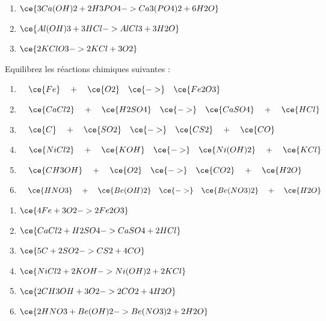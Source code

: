 \documentclass[
  11pt,
  a4paper,
  openany]{book}
\begin{document}
\begin{Answer}

\begin{enumerate}
\def\labelenumi{\arabic{enumi}.}
\item
  \(\ce{3Ca(OH)2 + 2H3PO4 -> Ca3(PO4)2 + 6H2O}\)
\item
  \(\ce{Al(OH)3 + 3HCl -> AlCl3 + 3H2O}\)
\item
  \(\ce{2KClO3 -> 2KCl + 3O2}\)
\end{enumerate}

\end{Answer}

\newpage

\begin{Exercise}

Equilibrez les réactions chimiques suivantes :

\begin{enumerate}
\def\labelenumi{\arabic{enumi}.}
\item
  \(\quad \ce{Fe} \quad + \quad \ce{O2} \quad \ce{->} \quad \ce{Fe2O3}\)
\item
  \(\quad \ce{CaCl2} \quad + \quad \ce{H2SO4} \quad \ce{->} \quad \ce{CaSO4} \quad + \quad \ce{HCl}\)
\item
  \(\quad \ce{C} \quad + \quad \ce{SO2} \quad \ce{->} \quad \ce{CS2} \quad + \quad \ce{CO}\)
\item
  \(\quad \ce{NiCl2} \quad + \quad \ce{KOH} \quad \ce{->} \quad \ce{Ni(OH)2} \quad + \quad \ce{KCl}\)
\item
  \(\quad \ce{CH3OH} \quad + \quad \ce{O2} \quad \ce{->} \quad \ce{CO2} \quad + \quad \ce{H2O}\)
\item
  \(\quad \ce{HNO3} \quad + \quad \ce{Be(OH)2} \quad \ce{->} \quad \ce{Be(NO3)2} \quad + \quad \ce{H2O}\)
\end{enumerate}

\end{Exercise}

\begin{Answer}

\begin{enumerate}
\def\labelenumi{\arabic{enumi}.}
\item
  \(\ce{4Fe + 3O2 -> 2Fe2O3}\)
\item
  \(\ce{CaCl2 + H2SO4 -> CaSO4 + 2HCl}\)
\item
  \(\ce{5C + 2SO2 -> CS2 + 4CO}\)
\item
  \(\ce{NiCl2 + 2KOH -> Ni(OH)2 + 2KCl}\)
\item
  \(\ce{2CH3OH + 3O2 -> 2CO2 + 4H2O}\)
\item
  \(\ce{2HNO3 + Be(OH)2 -> Be(NO3)2 + 2H2O}\)
\end{enumerate}

\end{Answer}
\end{document}
